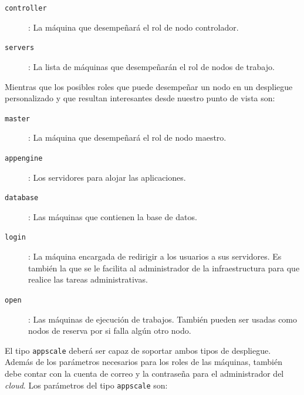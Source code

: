 \begin{description}
\item[\texttt{controller}]: La máquina que desempeñará el rol de nodo controlador.
\item[\texttt{servers}]: La lista de máquinas que desempeñarán el rol de nodos de trabajo.
\end{description}

Mientras que los posibles roles que puede desempeñar un nodo en un despliegue personalizado y que resultan interesantes desde nuestro punto de vista son:

\begin{description}
\item[\texttt{master}]: La máquina que desempeñará el rol de nodo maestro.
\item[\texttt{appengine}]: Los servidores para alojar las aplicaciones.
\item[\texttt{database}]: Las máquinas que contienen la base de datos.
\item[\texttt{login}]: La máquina encargada de redirigir a los usuarios a sus servidores. Es también la que se le facilita al administrador de la infraestructura para que realice las tareas administrativas.
\item[\texttt{open}]: Las máquinas de ejecución de trabajos. También pueden ser usadas como nodos de reserva por si falla algún otro nodo.
\end{description}

El tipo \texttt{appscale} deberá ser capaz de soportar ambos tipos de despliegue. Además de los parámetros necesarios para los roles de las máquinas, también debe contar con la cuenta de correo y la contraseña para el administrador del \emph{cloud}. Los parámetros del tipo \texttt{appscale} son:

